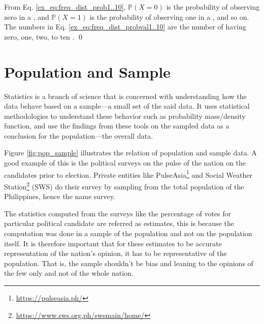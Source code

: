 \begin{exmpx}
From Eq. \ref{ex_eq:freq_dist_prob1..10}, $\mathbb{P}(X=0)$ is the probability of observing zero   in a  , and $\mathbb{P}(X=1)$ is the probability of observing one   in a  , and so on. The numbers in Eq. \ref{ex_eq:freq_dist_probval1..10} are the number of   having zero, one, two, to ten  .
\qed
\end{exmpx}
\section{Population and Sample}
Statistics is a branch of science that is concerned with understanding how the data behave based on a sample---a small set of the said data. It uses statistical methodologies to understand these behavior such as probability mass/density function, and use the findings from these tools on the sampled data as a conclusion for the population---the overall data.

Figure \ref{fig:pop_sample} illustrates the relation of population and sample data. A good example of this is the political surveys on the pulse of the nation on the candidates prior to election. Private entities like PulseAsia\footnote{\url{https://pulseasia.ph/}} and Social Weather Station\footnote{\url{https://www.sws.org.ph/swsmain/home/}} (SWS) do their survey by  sampling from the total population of the Philippines, hence the name survey.

The statistics computed from the surveys like the percentage of votes for particular political candidate are referred as estimates, this is because the computation was done in a sample of the population and not on the population itself. It is therefore important that for these estimates to be accurate representation of the nation's opinion, it has to be representative of the population. That is, the sample shouldn't be bias and leaning to the opinions of the few only and not of the whole nation.

